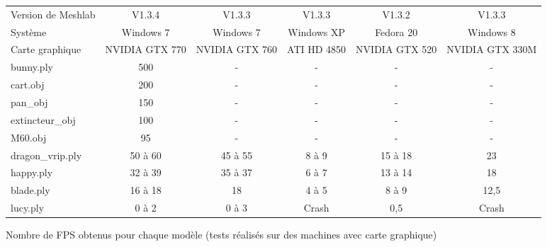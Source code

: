 \begin{figure}[h]
  \begin{changemargin}{-4cm}{-4cm}
    \centering
    \begin{tabular}{|l|c|c|c|c|c|}
      \hline
      Version de Meshlab & V1.3.4 & V1.3.3 & V1.3.3 & V1.3.2 & V1.3.3 \\
      Système & Windows 7 & Windows 7 & Windows XP & Fedora 20 & Windows 8 \\
      Carte graphique & NVIDIA GTX 770 & NVIDIA GTX 760 & ATI HD 4850 & NVIDIA GTX 520 & NVIDIA GTX 330M \\ \hline \hline
      bunny.ply & 500 & - & - & - & - \\ \hline
      cart.obj & 200 & - & - & - & - \\ \hline
      pan\_obj & 150 & - & - & - & - \\ \hline
      extincteur\_obj & 100 & - & - & - & - \\ \hline
      M60.obj & 95 & - & - & - & - \\ \hline
      dragon\_vrip.ply & 50 à 60 & 45 à 55 & 8 à 9 & 15 à 18 & 23 \\ \hline
      happy.ply & 32 à 39 & 35 à 37 & 6 à 7 & 13 à 14 & 18 \\ \hline
      blade.ply & 16 à 18 & 18 & 4 à 5 & 8 à 9 & 12,5 \\ \hline
      lucy.ply & 0 à 2 & 0 à 3 & Crash & 0,5 & Crash \\ \hline
    \end{tabular}
  \end{changemargin}
  \caption{Nombre de FPS obtenus pour chaque modèle (tests réalisés sur des machines avec carte graphique)}
  \label{tab:aveccg}
\end{figure}
